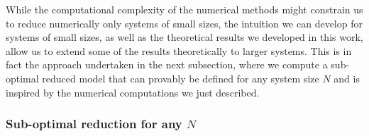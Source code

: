 \documentclass[aihp,12pt]{imsart}
\begin{document}
While the computational complexity of the numerical methods might constrain us to reduce numerically only systems of small sizes, the intuition we can develop for systems of small sizes, as well as the theoretical results we developed in this work, allow us to extend some of the results theoretically to larger systems. This is in fact the approach undertaken in the next subsection, where we compute a sub-optimal reduced model that can provably be defined for any system size $N$ and is inspired by the numerical computations we just described.    

\subsubsection{Sub-optimal reduction for any $N$}\label{sec:scalableex}
\end{document}
